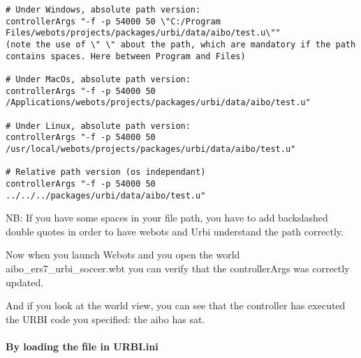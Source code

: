 \begin{lstlisting}[firstnumber=1,]
# Under Windows, absolute path version:
controllerArgs "-f -p 54000 50 \"C:/Program Files/webots/projects/packages/urbi/data/aibo/test.u\""
(note the use of \" \" about the path, which are mandatory if the path
contains spaces. Here between Program and Files)

# Under MacOs, absolute path version:
controllerArgs "-f -p 54000 50 /Applications/webots/projects/packages/urbi/data/aibo/test.u"

# Under Linux, absolute path version:
controllerArgs "-f -p 54000 50 /usr/local/webots/projects/packages/urbi/data/aibo/test.u"

# Relative path version (os independant)
controllerArgs "-f -p 54000 50 ../../../packages/urbi/data/aibo/test.u"
\end{lstlisting}

NB: If you have some spaces in your file path, you have to add
backslashed double quotes in order to have webots and Urbi understand
the path correctly.


Now when you launch Webots and you open the world
aibo\_ers7\_urbi\_soccer.wbt you can verify that the controllerArgs
was correctly updated.




And if you look at the world view, you can see that the controller has
executed the URBI code you specified: the aibo has sat.




\paragraph{By loading the file in URBI.ini}
\label{webots.firstrun.loadprograms.inURBIinifile}%

